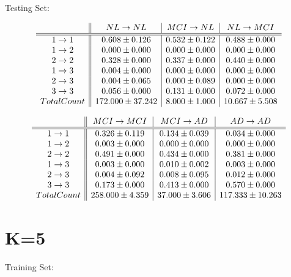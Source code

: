 \documentclass[12pt,a4paper]{article}
\begin{document}
Testing Set:

\[ \begin{array}{ c || c | c | c }
 & NL \rightarrow NL & MCI \rightarrow NL & NL \rightarrow MCI \\
\hline
\hline
1 \rightarrow 1 & 0.608 \pm 0.126 & 0.532 \pm 0.122 & 0.488 \pm 0.000 \\
1 \rightarrow 2 & 0.000 \pm 0.000 & 0.000 \pm 0.000 & 0.000 \pm 0.000 \\
2 \rightarrow 2 & 0.328 \pm 0.000 & 0.337 \pm 0.000 & 0.440 \pm 0.000 \\
1 \rightarrow 3 & 0.004 \pm 0.000 & 0.000 \pm 0.000 & 0.000 \pm 0.000 \\
2 \rightarrow 3 & 0.004 \pm 0.065 & 0.000 \pm 0.089 & 0.000 \pm 0.000 \\
3 \rightarrow 3 & 0.056 \pm 0.000 & 0.131 \pm 0.000 & 0.072 \pm 0.000 \\
Total Count & 172.000 \pm 37.242 & 8.000 \pm 1.000 & 10.667 \pm 5.508\\
\end{array} \]

\[ \begin{array}{ c || c | c | c }
& MCI \rightarrow MCI & MCI \rightarrow AD & AD \rightarrow AD \\
\hline
\hline
1 \rightarrow 1 & 0.326 \pm 0.119 & 0.134 \pm 0.039 & 0.034 \pm 0.000 \\
1 \rightarrow 2 & 0.003 \pm 0.000 & 0.000 \pm 0.000 & 0.000 \pm 0.000 \\
2 \rightarrow 2 & 0.491 \pm 0.000 & 0.434 \pm 0.000 & 0.381 \pm 0.000 \\
1 \rightarrow 3 & 0.003 \pm 0.000 & 0.010 \pm 0.002 & 0.003 \pm 0.000 \\
2 \rightarrow 3 & 0.004 \pm 0.092 & 0.008 \pm 0.095 & 0.012 \pm 0.000 \\
3 \rightarrow 3 & 0.173 \pm 0.000 & 0.413 \pm 0.000 & 0.570 \pm 0.000 \\
Total Count & 258.000 \pm 4.359 & 37.000 \pm 3.606 & 117.333 \pm 10.263 \\
\end{array} \]

\section{K=5}

Training Set:
\end{document}
